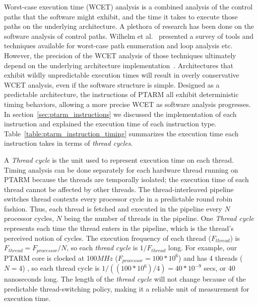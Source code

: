 \label{subsec:precision_timing_inst_ptarm}

Worst-case execution time (WCET) analysis is a combined analysis of the control paths that the software might exhibit, and the time it takes to execute those paths on the underlying architecture. 
A plethora of research has been done on the software analysis of control paths. 
Wilhelm et al.~\cite{wilhelm-survey-paper} presented a survey of tools and techniques available for worst-case path enumeration and loop analysis etc.
However, the precision of the WCET analysis of those techniques ultimately depend on the underlying architecture implementation~\cite{Heckmann2003processor}.
Architectures that exhibit wildly unpredictable execution times will result in overly conservative WCET analysis, even if the software structure is simple. 
Designed as a predictable architecture, the instructions of PTARM all exhibit deterministic timing behaviors, allowing a more precise WCET as software analysis progresses. 
In section~\ref{sec:ptarm_instructions} we discussed the implementation of each instruction and explained the execution time of each instruction type.
Table~\ref{table:ptarm_instruction_timing} summarizes the execution time each instruction takes in terms of \emph{thread cycles}. 

A \emph{Thread cycle} is the unit used to represent execution time on each thread.  
Timing analysis can be done separately for each hardware thread running on PTARM because the threads are temporally isolated; the execution time of each thread cannot be affected by other threads.
The thread-interleaved pipeline switches thread contexts every processor cycle in a predictable round robin fashion. 
Thus, each thread is fetched and executed in the pipeline every $N$ processor cycles, $N$ being the number of threads in the pipeline.
One \emph{Thread cycle} represents each time the thread enters in the pipeline, which is the thread's perceived notion of cycles.
The execution frequency of each thread ($F_{thread}$) is $F_{thread} = F_{processor}/N$, so each \emph{thread cycle} is $1/F_{thread}$ long. 
For example, our PTARM core is clocked at 100$MHz$ ($F_{processor} = 100 * 10^6$) and has 4 threads ($N=4$) , so each thread cycle is $1/((100 * 10^6)/4) = 40 * 10^{-9}$ secs, or 40 nanoseconds long.
The length of the \emph{thread cycle} will not change because of the predictable thread-switching policy, making it a reliable unit of measurement for execution time.   

